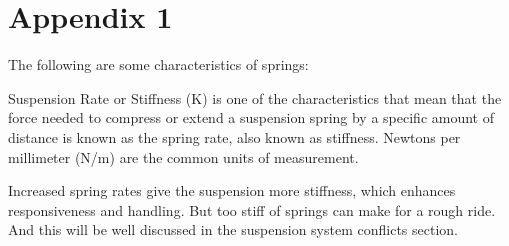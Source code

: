 \section{Appendix 1 }
The following are some characteristics of springs:

Suspension Rate or Stiffness (K) is one of the characteristics that mean that the force needed to compress or extend a suspension spring by a specific amount of distance is known as the spring rate, also known as stiffness. Newtons per millimeter (N/m) are the common units of measurement.

Increased spring rates give the suspension more stiffness, which enhances responsiveness and handling. But too stiff of springs can make for a rough ride. And this will be well discussed in the suspension system conflicts section. \cite{trzesniowski2023suspension}

